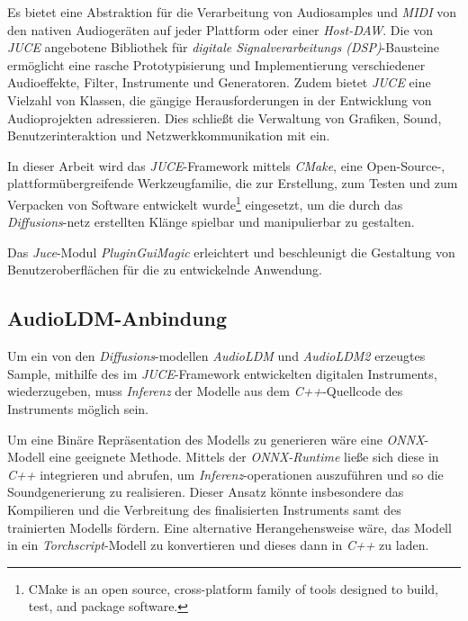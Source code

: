 \documentclass[
  a4paper,  %
  twoside,  %
  bibliography=totoc,
  headsepline,
  cleardoublepage=empty,
  parskip=half,
  draft=false
]{scrbook}
\begin{document}
Es bietet eine Abstraktion für die Verarbeitung von Audiosamples und \emph{MIDI} von den nativen Audiogeräten auf jeder Plattform oder einer \emph{Host-DAW}. Die von \emph{JUCE} angebotene Bibliothek für \emph{digitale Signalverarbeitungs (DSP)}-Bausteine ermöglicht eine rasche Prototypisierung und Implementierung verschiedener Audioeffekte, Filter, Instrumente und Generatoren. \cite{noauthor_juce_nodate} Zudem bietet \emph{JUCE} eine Vielzahl von Klassen, die gängige Herausforderungen in der Entwicklung von Audioprojekten adressieren. Dies schließt die Verwaltung von Grafiken, Sound, Benutzerinteraktion und Netzwerkkommunikation mit ein. \cite{robinson_getting_2013}

In dieser Arbeit wird das \emph{JUCE}-Framework mittels \emph{CMake}, \glqq eine Open-Source-, plattformübergreifende Werkzeugfamilie, die zur Erstellung, zum Testen und zum Verpacken von Software entwickelt wurde\grqq \footnote{CMake is an open source, cross-platform family of tools designed to build, test, and package software.} \cite{noauthor_cmake_nodate} eingesetzt, um die durch das \emph{Diffusions}-netz erstellten Klänge spielbar und manipulierbar zu gestalten. 

Das \emph{Juce}-Modul \emph{PluginGuiMagic} \cite{walz_plugin_nodate} erleichtert und beschleunigt die Gestaltung von Benutzeroberflächen für die zu entwickelnde Anwendung.

\subsection{AudioLDM-Anbindung} \label{sec:api}
Um ein von den \emph{Diffusions}-modellen \emph{AudioLDM} und \emph{AudioLDM2} erzeugtes Sample, mithilfe des im \emph{JUCE}-Framework entwickelten digitalen Instruments, wiederzugeben, muss \emph{Inferenz} der Modelle aus dem \emph{C++}-Quellcode des Instruments möglich sein.

Um eine Binäre Repräsentation des Modells zu generieren wäre eine \emph{ONNX}-Modell \cite{noauthor_onnx_nodate} eine geeignete Methode. Mittels der \emph{ONNX-Runtime} \cite{noauthor_onnx-runtime_nodate} ließe sich diese in \emph{C++} integrieren und abrufen, um \emph{Inferenz}-operationen auszuführen und so die Soundgenerierung zu realisieren. Dieser Ansatz könnte insbesondere das Kompilieren und die Verbreitung des finalisierten Instruments samt des trainierten Modells fördern. Eine alternative Herangehensweise wäre, das Modell in ein \emph{Torchscript}-Modell \cite{noauthor_torchscript_nodate} zu konvertieren und dieses dann in \emph{C++} zu laden. \cite{oli_larkin_machine_2023}
\end{document}
